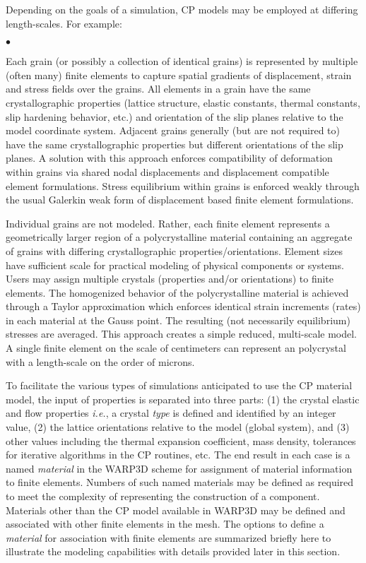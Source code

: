 \documentclass[11pt]{report}
\numberwithin{equation}{section}
\newcommand{\ie}{\emph{i.e.},\xspace}
\newcommand{\ti}{\emph}
\newcommand{\squishlist}{
 \begin{list}{$\bullet$}
  { \setlength{\itemsep}{0pt}
     \setlength{\parsep}{3pt}
     \setlength{\topsep}{3pt}
     \setlength{\partopsep}{0pt}
     \setlength{\leftmargin}{1.5em}
     \setlength{\labelwidth}{1em}
     \setlength{\labelsep}{0.5em} } }
\newcommand{\squishend}{
  \end{list}  }
\begin{document}
Depending on the goals of a simulation, CP models may be employed at  differing length-scales. For example: 

\small
\squishlist
\item Each grain (or possibly a collection of identical grains) is represented by multiple 
(often many) finite elements to capture spatial gradients of displacement, strain and 
stress fields over the grains. All elements in a grain have the same crystallographic 
properties (lattice structure, elastic constants, thermal constants, slip  hardening behavior, etc.) 
and orientation of the slip planes relative to the model coordinate system. 
Adjacent grains generally (but are not required to) 
have the same crystallographic properties but different orientations of the slip planes. 
A solution with this approach enforces compatibility of 
deformation within grains via shared nodal displacements and displacement 
compatible element formulations. Stress equilibrium within grains is 
enforced weakly through the usual Galerkin weak form of displacement based 
finite element formulations.
\item
Individual grains are not modeled. Rather, each finite element represents a 
geometrically larger region of a polycrystalline material containing an aggregate of 
grains with differing crystallographic properties/orientations. Element sizes have 
sufficient scale for practical modeling of physical components or systems. Users may 
assign multiple crystals (properties and/or orientations) to finite elements.
The homogenized behavior of the polycrystalline material is achieved through a Taylor \cite{T38} 
approximation which enforces identical strain increments (rates) in each material at the 
Gauss point. The resulting (not necessarily equilibrium) stresses are averaged. 
This approach creates a simple reduced, multi-scale model. A single finite element on 
the scale of centimeters can represent an polycrystal with a length-scale on the order of microns.
\squishend
\normalsize
 To facilitate the various types of simulations anticipated to use the CP material model, 
 the input of properties is separated into three parts: (1) the crystal elastic and flow 
 properties \ie a crystal \ti{type} is defined and identified by an integer value, (2) the 
 lattice orientations relative to the model (global system), and (3) other values 
 including the thermal expansion coefficient, mass density,  tolerances for iterative 
 algorithms in the CP routines, etc. The end result in each case is a named \ti{material} 
 in the WARP3D scheme for assignment of material information to finite elements. 
 Numbers of  such named materials may be defined as required to meet the complexity 
 of representing the construction of a
 component. Materials other than the CP model available in
 WARP3D may be defined and associated with other finite elements
 in the mesh. The options to define a \ti{material} for association with finite elements 
 are summarized briefly here to illustrate the modeling capabilities with details 
 provided later in this section.
 
\end{document}
